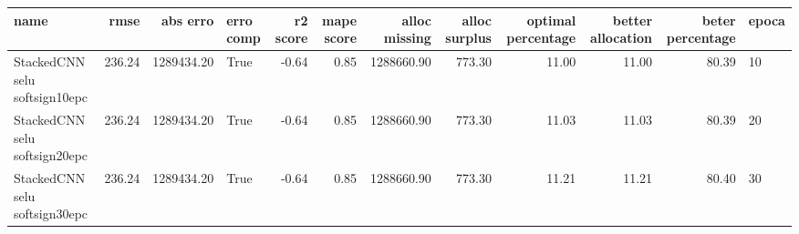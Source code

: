 \begin{tabular}{lrrlrrrrrrrl}
\toprule
name & rmse & abs erro & erro comp & r2 score & mape score & alloc missing & alloc surplus & optimal percentage & better allocation & beter percentage & epoca \\
\midrule
StackedCNN selu softsign10epc & 236.24 & 1289434.20 & True & -0.64 & 0.85 & 1288660.90 & 773.30 & 11.00 & 11.00 & 80.39 & 10 \\
StackedCNN selu softsign20epc & 236.24 & 1289434.20 & True & -0.64 & 0.85 & 1288660.90 & 773.30 & 11.03 & 11.03 & 80.39 & 20 \\
StackedCNN selu softsign30epc & 236.24 & 1289434.20 & True & -0.64 & 0.85 & 1288660.90 & 773.30 & 11.21 & 11.21 & 80.40 & 30 \\
\bottomrule
\end{tabular}

